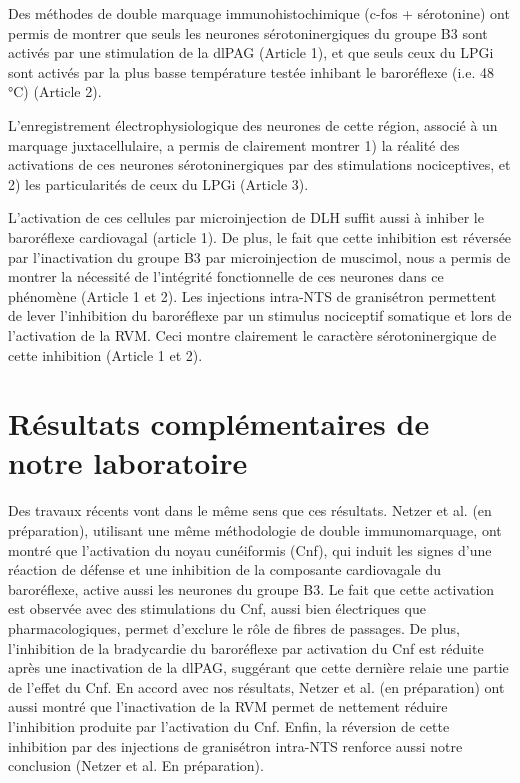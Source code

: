 \documentclass[a4paper,12pt,twoside]{report}
\begin{document}
Des méthodes de double marquage immunohistochimique (c-fos + sérotonine) ont permis de montrer que seuls les neurones sérotoninergiques du groupe B3 sont activés par une stimulation de la dlPAG (Article 1), et que seuls ceux du LPGi sont activés par la plus basse température testée inhibant le baroréflexe (i.e. 48 °C) (Article 2). 

L’enregistrement électrophysiologique des neurones de cette région, associé à un marquage juxtacellulaire, a permis de clairement montrer 1) la réalité des activations de ces neurones sérotoninergiques par des stimulations nociceptives, et 2) les particularités de ceux du LPGi (Article 3).

L’activation de ces cellules par microinjection de DLH suffit aussi à inhiber le baroréflexe cardiovagal (article 1). De plus, le fait que cette inhibition est réversée par l’inactivation du groupe B3 par microinjection de muscimol, nous a permis de montrer la nécessité de l’intégrité fonctionnelle de ces neurones dans ce phénomène (Article 1 et 2). Les injections intra-NTS de granisétron permettent de lever l’inhibition du baroréflexe par un stimulus nociceptif somatique et lors de l’activation de la RVM. Ceci montre clairement le caractère sérotoninergique de cette inhibition (Article 1 et 2). 

\section{Résultats complémentaires de notre laboratoire}

Des travaux récents vont dans le même sens que ces résultats. Netzer et al. (en préparation), utilisant une même méthodologie de double immunomarquage, ont montré que l’activation du noyau cunéiformis (Cnf), qui induit les signes d’une réaction de défense et une inhibition de la composante cardiovagale du baroréflexe, active aussi les neurones du groupe B3. Le fait que cette activation est observée avec des stimulations du Cnf, aussi bien électriques que pharmacologiques, permet d’exclure le rôle de fibres de passages. De plus, l’inhibition de la bradycardie du baroréflexe par activation du Cnf est réduite après une inactivation de la dlPAG, suggérant que cette dernière relaie une partie de l’effet du Cnf. En accord avec nos résultats, Netzer et al. (en préparation) ont aussi montré que l’inactivation de la RVM permet de nettement réduire l’inhibition produite par l’activation du Cnf. Enfin, la réversion de cette inhibition par des injections de granisétron intra-NTS renforce aussi notre conclusion (Netzer et al. En préparation). 
\end{document}
